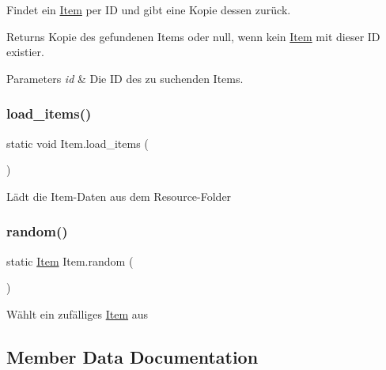 Findet ein \hyperlink{class_item}{Item} per ID und gibt eine Kopie dessen zurück. 

\begin{DoxyReturn}{Returns}
Kopie des gefundenen Items oder null, wenn kein \hyperlink{class_item}{Item} mit dieser ID existier.
\end{DoxyReturn}

\begin{DoxyParams}{Parameters}
{\em id} & Die ID des zu suchenden Items.\\
\hline
\end{DoxyParams}
\mbox{\label{class_item_abb13a205923316049fa1854b954a55a0}} 
\subsubsection{\texorpdfstring{load\+\_\+items()}{load\_items()}}
{\footnotesize\ttfamily static void Item.\+load\+\_\+items (\begin{DoxyParamCaption}{ }\end{DoxyParamCaption})\hspace{0.3cm}{\ttfamily [static]}}



Lädt die Item-\/\+Daten aus dem Resource-\/\+Folder 

\mbox{\label{class_item_a6728fc973c3b5a55a14fcfe8c65c541c}} 
\subsubsection{\texorpdfstring{random()}{random()}}
{\footnotesize\ttfamily static \hyperlink{class_item}{Item} Item.\+random (\begin{DoxyParamCaption}{ }\end{DoxyParamCaption})\hspace{0.3cm}{\ttfamily [static]}}



Wählt ein zufälliges \hyperlink{class_item}{Item} aus 



\subsection{Member Data Documentation}
\mbox{\label{class_item_a3be388595e4069403ed40296fe9a104a}} 
